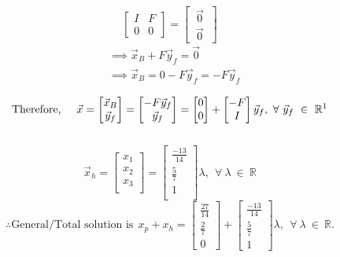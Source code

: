 \documentclass{article}
\begin{document}
\[
\left[\begin{array}{c|c}
    I &F \\
    \hline 
    0 &0 
  \end{array}\right] = \begin{bmatrix}
                            ~\vec{0}~\\
                            \hline
                            ~\vec{0}~
                          \end{bmatrix}
\]
\begin{align*}
&\implies \vec{x}_B + F\vec{y}_f = \vec{0} \\
&\implies \vec{x}_B = 0 - F\vec{y}_f = -F\vec{y}_f\\
\end{align*}
\[
\text{Therefore,\hspace{5mm}}  \vec{x} =  
\begin{bmatrix}
    \vec{x}_B\\ 
    \vec{y}_f
\end{bmatrix} = \begin{bmatrix}
                -F\vec{y}_f\\\vec{y}_f
                \end{bmatrix} = \begin{bmatrix}
                                0\\0
                                \end{bmatrix} + \begin{bmatrix}
                                                    -F\\I
                                                \end{bmatrix} \vec{y}_f, ~\forall ~ \vec{y}_f~\in~ \mathbb{R}^1 \]
\\
\[
\vec{x}_h = \begin{bmatrix}
                x_1\\x_2\\x_3\\
            \end{bmatrix} = \begin{bmatrix}
                                \frac{-13}{14}\\
                                \frac{5}{7}\\
                                1\\
                                \end{bmatrix}\lambda, ~~\forall~\lambda~\in~\mathbb{R}
\]
\[
\therefore\text{General/Total solution is}~~ x_p + x_h = 
\begin{bmatrix}
    \frac{27}{14}\\
    \frac{2}{7}\\
    0
\end{bmatrix} + \begin{bmatrix}
                  \frac{-13}{14}\\
                  \frac{5}{7}\\
                  1
                \end{bmatrix}\lambda, ~~\forall~\lambda~ \in~ \mathbb{R}.
\]\\
\end{document}

